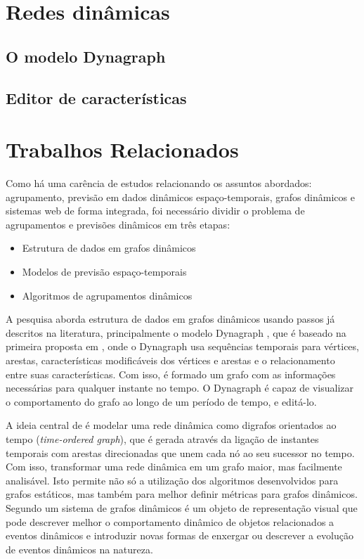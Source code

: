 \section{Redes dinâmicas}
\subsection{O modelo Dynagraph}
\subsection{Editor de características}
\section{Trabalhos Relacionados}

Como há uma carência de estudos relacionando os assuntos abordados: agrupamento,
previsão em dados dinâmicos espaço-temporais, grafos dinâmicos e sistemas web
de forma integrada, foi necessário dividir o problema de agrupamentos e previsões dinâmicos em três etapas:
\begin{itemize}
\item Estrutura de dados em grafos dinâmicos
\item Modelos de previsão espaço-temporais
\item Algoritmos de agrupamentos dinâmicos
\end{itemize}

A pesquisa aborda estrutura de dados em grafos dinâmicos usando passos já descritos na literatura,
principalmente o modelo Dynagraph \cite{dynagraph}, que é baseado na primeira proposta
em \cite{dynagraph2012}, onde o Dynagraph usa sequências temporais para vértices, arestas,
características modificáveis dos vértices e arestas e o relacionamento entre suas características.
Com isso, é formado um grafo com as informações necessárias para qualquer instante no tempo.
O Dynagraph é capaz de visualizar o comportamento do grafo ao longo de um período de tempo,
e editá-lo.

A ideia central de \cite{kim} é modelar uma rede dinâmica como digrafos orientados ao
tempo (\textit{time-ordered graph}), que é gerada através da ligação de instantes temporais com arestas
direcionadas que unem cada nó ao seu sucessor no tempo. Com isso, transformar uma rede dinâmica
em um grafo maior, mas facilmente analisável. Isto permite não só a utilização dos algoritmos 
desenvolvidos para grafos estáticos, mas também para melhor definir métricas para grafos dinâmicos.
Segundo \cite{kim} um sistema de grafos dinâmicos é um objeto de representação visual
que pode descrever melhor o comportamento dinâmico de objetos relacionados a eventos dinâmicos e
introduzir novas formas de enxergar ou descrever a evolução de eventos dinâmicos na natureza.

